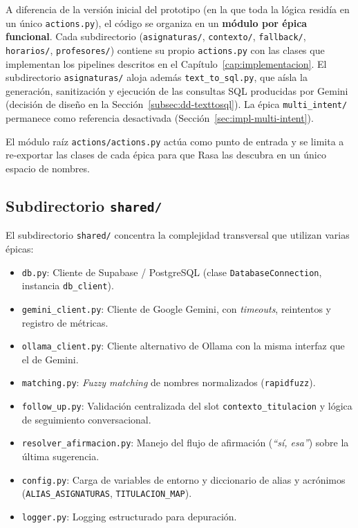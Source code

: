 A diferencia de la versión inicial del prototipo (en la que toda la lógica residía en un único \texttt{actions.py}), el código se organiza en un \textbf{módulo por épica funcional}. Cada subdirectorio (\texttt{asignaturas/}, \texttt{contexto/}, \texttt{fallback/}, \texttt{horarios/}, \texttt{profesores/}) contiene su propio \texttt{actions.py} con las clases que implementan los pipelines descritos en el Capítulo~\ref{cap:implementacion}. El subdirectorio \texttt{asignaturas/} aloja además \texttt{text\_to\_sql.py}, que aísla la generación, sanitización y ejecución de las consultas SQL producidas por Gemini (decisión de diseño en la Sección~\ref{subsec:dd-texttosql}). La épica \texttt{multi\_intent/} permanece como referencia desactivada (Sección~\ref{sec:impl-multi-intent}).

El módulo raíz \texttt{actions/actions.py} actúa como punto de entrada y se limita a re-exportar las clases de cada épica para que Rasa las descubra en un único espacio de nombres.

\subsection{Subdirectorio \texttt{shared/}}

El subdirectorio \texttt{shared/} concentra la complejidad transversal que utilizan varias épicas:

\begin{itemize}
    \item \texttt{db.py}: Cliente de Supabase / PostgreSQL (clase \texttt{DatabaseConnection}, instancia \texttt{db\_client}).
    \item \texttt{gemini\_client.py}: Cliente de Google Gemini, con \textit{timeouts}, reintentos y registro de métricas.
    \item \texttt{ollama\_client.py}: Cliente alternativo de Ollama con la misma interfaz que el de Gemini.
    \item \texttt{matching.py}: \textit{Fuzzy matching} de nombres normalizados (\texttt{rapidfuzz}).
    \item \texttt{follow\_up.py}: Validación centralizada del slot \texttt{contexto\_titulacion} y lógica de seguimiento conversacional.
    \item \texttt{resolver\_afirmacion.py}: Manejo del flujo de afirmación (\textit{``sí, esa''}) sobre la última sugerencia.
    \item \texttt{config.py}: Carga de variables de entorno y diccionario de alias y acrónimos (\texttt{ALIAS\_ASIGNATURAS}, \texttt{TITULACION\_MAP}).
    \item \texttt{logger.py}: Logging estructurado para depuración.
\end{itemize}

